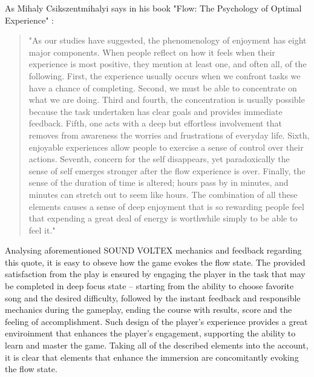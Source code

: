 As Mihaly Csikszentmihalyi says in his book "Flow: The Psychology of Optimal Experience" \cite{csikszentmihalyi1990flow}:
\begin{quote}
    \singlespacing
    "As our studies have suggested, the phenomenology of enjoyment has eight major components. When people reflect on how it feels when their experience is most positive, they mention at least one, and often all, of the following. First, the experience usually occurs when we confront tasks we have a chance of completing. Second, we must be able to concentrate on what we are doing. Third and fourth, the concentration is usually possible because the task undertaken has clear goals and provides immediate feedback. Fifth, one acts with a deep but effortless involvement that removes from awareness the worries and frustrations of everyday life. Sixth, enjoyable experiences allow people to exercise a sense of control over their actions. Seventh, concern for the self disappears, yet paradoxically the sense of self emerges stronger after the flow experience is over. Finally, the sense of the duration of time is altered; hours pass by in minutes, and minutes can stretch out to seem like hours. The
    combination of all these elements causes a sense of deep enjoyment that is so rewarding people feel that expending a great deal of energy is worthwhile simply to be able to feel it."
    \singlespacing
\end{quote}

Analysing aforementioned SOUND VOLTEX mechanics and feedback regarding this quote, it is easy to obseve how the game evokes the flow state. The provided satisfaction from the play is ensured by engaging the player in the task that may be completed in deep focus state -- starting from the ability to choose favorite song and the desired difficulty, followed by the instant feedback and responsible mechanics during the gameplay, ending the course with results, score and the feeling of accomplishment. Such design of the player's experience provides a great enviroinment that enhances the player's engagement, supporting the ability to learn and master the game. Taking all of the described elements into the account, it is clear that elements that enhance the immersion are concomitantly evoking the flow state.


